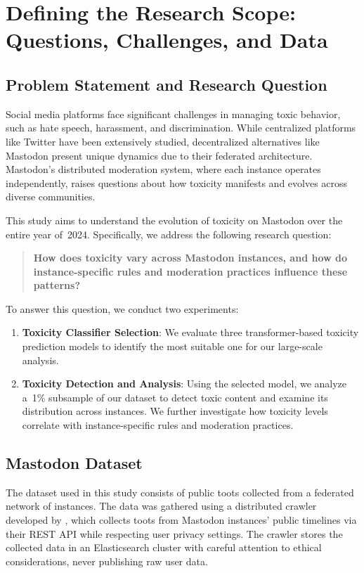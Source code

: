 \chapter{Defining the Research Scope: Questions, Challenges, and Data}

\section{Problem Statement and Research Question}
Social media platforms face significant challenges in managing toxic behavior, such as hate speech, harassment, and discrimination. While centralized platforms like Twitter have been extensively studied, decentralized alternatives like Mastodon present unique dynamics due to their federated architecture. Mastodon's distributed moderation system, where each instance operates independently, raises questions about how toxicity manifests and evolves across diverse communities.

This study aims to understand the evolution of toxicity on Mastodon over the entire year of~2024. Specifically, we address the following research question:

\begin{quote}
\textbf{How does toxicity vary across Mastodon instances, and how do instance-specific rules and moderation practices influence these patterns?}
\end{quote}

To answer this question, we conduct two experiments:

\begin{enumerate}
    \item \textbf{Toxicity Classifier Selection}: We evaluate three transformer-based toxicity prediction models to identify the most suitable one for our large-scale analysis.
    
    \item \textbf{Toxicity Detection and Analysis}: Using the selected model, we analyze a~1\% subsample of our dataset to detect toxic content and examine its distribution across instances. We further investigate how toxicity levels correlate with instance-specific rules and moderation practices.
\end{enumerate}

\section{Mastodon Dataset} \label{mastodon-dataset}
The dataset used in this study consists of public toots collected from a federated network of instances. The data was gathered using a distributed crawler developed by \citet{ernst:2024}, which collects toots from Mastodon instances' public timelines via their REST API while respecting user privacy settings. The crawler stores the collected data in an Elasticsearch cluster with careful attention to ethical considerations, never publishing raw user data.

